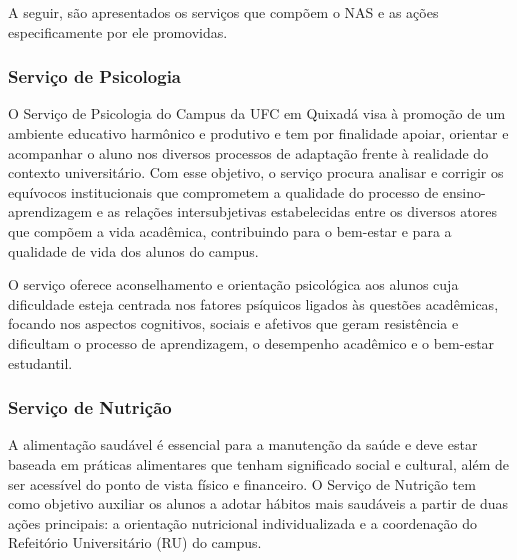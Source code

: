 

A seguir, são apresentados os serviços que compõem o NAS e as ações especificamente por ele promovidas.

\subsubsection{Serviço de Psicologia}

O Serviço de Psicologia do Campus da UFC em Quixadá visa à promoção de um ambiente educativo harmônico e produtivo e tem por finalidade apoiar, orientar e acompanhar o aluno nos diversos processos de adaptação frente à realidade do contexto universitário. Com esse objetivo, o serviço procura analisar e corrigir os equívocos institucionais que comprometem a qualidade do processo de ensino-aprendizagem e as relações intersubjetivas estabelecidas entre os diversos atores que compõem a vida acadêmica, contribuindo para o bem-estar e para a qualidade de vida dos alunos do campus.

O serviço oferece aconselhamento e orientação psicológica aos alunos cuja dificuldade esteja centrada nos fatores psíquicos ligados às questões acadêmicas, focando nos aspectos cognitivos, sociais e afetivos que geram resistência e dificultam o processo de aprendizagem, o desempenho acadêmico e o bem-estar estudantil.

\subsubsection{Serviço de Nutrição}

A alimentação saudável é essencial para a manutenção da saúde e deve estar baseada em práticas alimentares que tenham significado social e cultural, além de ser acessível do ponto de vista físico e financeiro. O Serviço de Nutrição tem como objetivo auxiliar os alunos a adotar hábitos mais saudáveis a partir de duas ações principais: a orientação nutricional individualizada e a coordenação do Refeitório Universitário (RU) do campus.

